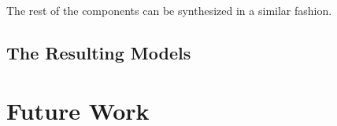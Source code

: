 The rest of the components can be synthesized in a similar fashion. 

\subsection{The Resulting Models} \label{subs_casestudyresults}


\section{Future Work} \label{sec_futurework}


